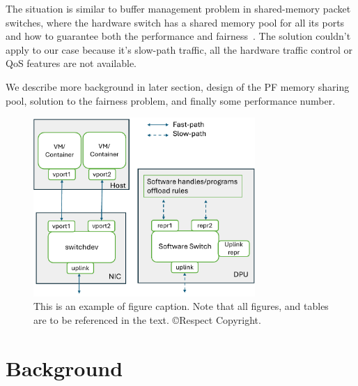 \documentclass[letterpaper]{article}
\begin{document}
The situation is similar to buffer management problem in shared-memory
packet switches, where the hardware switch has a shared memory pool
for all its ports and how to guarantee both the performance and
fairness~\cite{devlinksb}. The solution couldn't apply to
our case because it's slow-path traffic, all the hardware traffic
control or QoS features are not available.

We describe more background in later section, design of the PF memory
sharing pool, solution to the fairness problem, and finally some performance
number.
\begin{figure}[h]
\includegraphics[width=3.31in]{arch.pdf}
\caption{This is an example of figure caption. Note that all figures, and tables are to be referenced in the text. \copyright Respect Copyright.}
\end{figure}

\section{Background}
\end{document}
